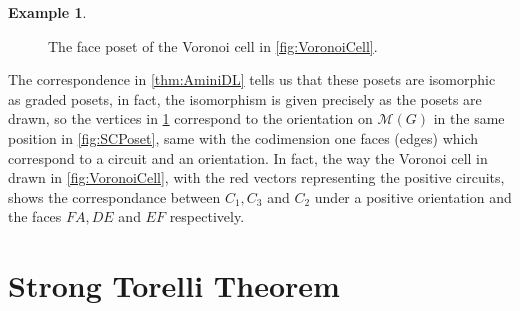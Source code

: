 \documentclass[12pt]{report}
\theoremstyle{definition}
\newtheorem{example}[theorem]{Example}
\def\calF{\mathcal F}
\def\calM{\mathcal M}
\def\calV{\mathcal V}
\theoremstyle{upright}
\begin{document}
\begin{example}
\begin{figure}[htbp]
        \begin{center}

        
        \end{center}
    
        \caption{The face poset of the Voronoi cell in \cref{fig:VoronoiCell}.}\label{fig:FPPoset}
    
    \end{figure}

    The correspondence in \cref{thm:AminiDL} tells us that these posets are isomorphic as graded posets, in fact, the isomorphism is given precisely as the posets are drawn, so the vertices in \cref{fig:FPPoset} correspond to the orientation on $\calM(G)$ in the same position in \cref{fig:SCPoset}, same with the codimension one faces (edges) which correspond to a circuit and an orientation.
    In fact, the way the Voronoi cell in drawn in \cref{fig:VoronoiCell}, with the red vectors representing the positive circuits, shows the correspondance between $C_1, C_3$ and $C_2$ under a positive orientation and the faces $FA, DE$ and $EF$ respectively.
    
\end{example}

\section{Strong Torelli Theorem}
\label{sec:StrongTorelli}
\end{document}
